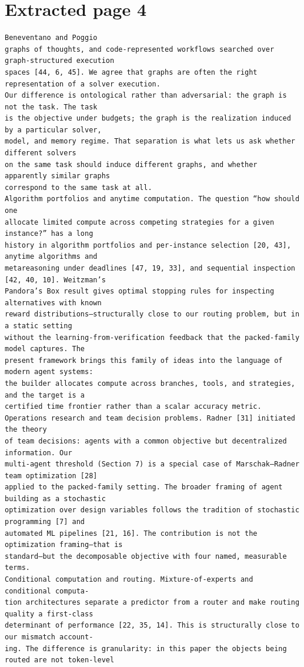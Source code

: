 \documentclass[11pt]{article}
\begin{document}
\section*{Extracted page 4}
\begin{verbatim}
Beneventano and Poggio
graphs of thoughts, and code-represented workflows searched over graph-structured execution
spaces [44, 6, 45]. We agree that graphs are often the right representation of a solver execution.
Our difference is ontological rather than adversarial: the graph is not the task. The task
is the objective under budgets; the graph is the realization induced by a particular solver,
model, and memory regime. That separation is what lets us ask whether different solvers
on the same task should induce different graphs, and whether apparently similar graphs
correspond to the same task at all.
Algorithm portfolios and anytime computation. The question “how should one
allocate limited compute across competing strategies for a given instance?” has a long
history in algorithm portfolios and per-instance selection [20, 43], anytime algorithms and
metareasoning under deadlines [47, 19, 33], and sequential inspection [42, 40, 10]. Weitzman’s
Pandora’s Box result gives optimal stopping rules for inspecting alternatives with known
reward distributions—structurally close to our routing problem, but in a static setting
without the learning-from-verification feedback that the packed-family model captures. The
present framework brings this family of ideas into the language of modern agent systems:
the builder allocates compute across branches, tools, and strategies, and the target is a
certified time frontier rather than a scalar accuracy metric.
Operations research and team decision problems. Radner [31] initiated the theory
of team decisions: agents with a common objective but decentralized information. Our
multi-agent threshold (Section 7) is a special case of Marschak–Radner team optimization [28]
applied to the packed-family setting. The broader framing of agent building as a stochastic
optimization over design variables follows the tradition of stochastic programming [7] and
automated ML pipelines [21, 16]. The contribution is not the optimization framing—that is
standard—but the decomposable objective with four named, measurable terms.
Conditional computation and routing. Mixture-of-experts and conditional computa-
tion architectures separate a predictor from a router and make routing quality a first-class
determinant of performance [22, 35, 14]. This is structurally close to our mismatch account-
ing. The difference is granularity: in this paper the objects being routed are not token-level

\end{verbatim}
\end{document}
